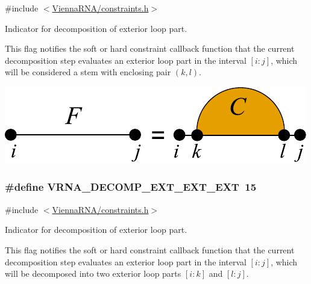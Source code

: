 {\ttfamily \#include $<$\hyperlink{constraints_8h}{Vienna\+R\+N\+A/constraints.\+h}$>$}



Indicator for decomposition of exterior loop part. 

This flag notifies the soft or hard constraint callback function that the current decomposition step evaluates an exterior loop part in the interval $[i:j]$, which will be considered a stem with enclosing pair $(k,l)$.

 
\begin{DoxyImageNoCaption}
  \mbox{\includegraphics[width=\textwidth,height=\textheight/2,keepaspectratio=true]{decomp_ext_stem}}
\end{DoxyImageNoCaption}
\subsubsection[{\texorpdfstring{V\+R\+N\+A\+\_\+\+D\+E\+C\+O\+M\+P\+\_\+\+E\+X\+T\+\_\+\+E\+X\+T\+\_\+\+E\+XT}{VRNA_DECOMP_EXT_EXT_EXT}}]{\setlength{\rightskip}{0pt plus 5cm}\#define V\+R\+N\+A\+\_\+\+D\+E\+C\+O\+M\+P\+\_\+\+E\+X\+T\+\_\+\+E\+X\+T\+\_\+\+E\+XT~15}\hypertarget{group__constraints_ga803bd818b3f4b2b0a4a5cfa2f7dc2045}{}\label{group__constraints_ga803bd818b3f4b2b0a4a5cfa2f7dc2045}


{\ttfamily \#include $<$\hyperlink{constraints_8h}{Vienna\+R\+N\+A/constraints.\+h}$>$}



Indicator for decomposition of exterior loop part. 

This flag notifies the soft or hard constraint callback function that the current decomposition step evaluates an exterior loop part in the interval $[i:j]$, which will be decomposed into two exterior loop parts $[i:k]$ and $[l:j]$.

